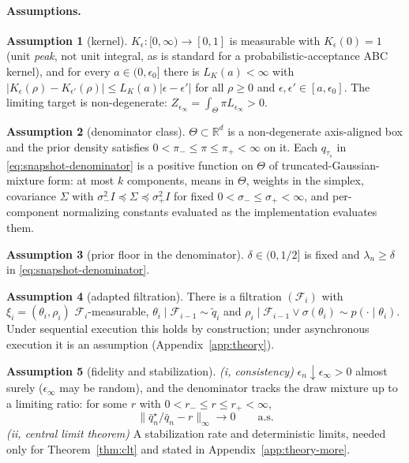 \documentclass[10pt]{article}
\theoremstyle{plain}
\theoremstyle{definition}
\newtheorem{assumption}{Assumption}
\begin{document}
\paragraph{Assumptions.}
\begin{assumption}[kernel]\label{ass:kernel} $K_\epsilon:[0,\infty)\to[0,1]$ is measurable with $K_\epsilon(0)=1$ (unit \emph{peak}, not unit integral, as is standard for a probabilistic-acceptance ABC kernel), and for every $a\in(0,\epsilon_0]$ there is $L_K(a)<\infty$ with $|K_\epsilon(\rho)-K_{\epsilon'}(\rho)|\le L_K(a)|\epsilon-\epsilon'|$ for all $\rho\ge0$ and $\epsilon,\epsilon'\in[a,\epsilon_0]$. The limiting target is non-degenerate: $Z_{\epsilon_\infty}=\int_\Theta\pi L_{\epsilon_\infty}>0$.\end{assumption}
\begin{assumption}[denominator class]\label{ass:class} $\Theta\subset\mathbb{R}^d$ is a non-degenerate axis-aligned box and the prior density satisfies $0<\pi_-\le\pi\le\pi_+<\infty$ on it. Each $q_{\tau_s}$ in \eqref{eq:snapshot-denominator} is a positive function on $\Theta$ of truncated-Gaussian-mixture form: at most $k$ components, means in $\Theta$, weights in the simplex, covariance $\Sigma$ with $\sigma_-^2I\preceq\Sigma\preceq\sigma_+^2I$ for fixed $0<\sigma_-\le\sigma_+<\infty$, and per-component normalizing constants evaluated as the implementation evaluates them.\end{assumption}
\begin{assumption}[prior floor in the denominator]\label{ass:defensive} $\delta\in(0,1/2]$ is fixed and $\lambda_n\ge\delta$ in \eqref{eq:snapshot-denominator}.\end{assumption}
\begin{assumption}[adapted filtration]\label{ass:filtration} There is a filtration $(\mathcal{F}_i)$ with $\xi_i=(\theta_i,\rho_i)$ $\mathcal{F}_i$-measurable, $\theta_i\mid\mathcal{F}_{i-1}\sim\tilde q_i$ and $\rho_i\mid\mathcal{F}_{i-1}\vee\sigma(\theta_i)\sim p(\cdot\mid\theta_i)$. Under sequential execution this holds by construction; under asynchronous execution it is an assumption (Appendix~\ref{app:theory}).\end{assumption}
\begin{assumption}[fidelity and stabilization]\label{ass:stab} \emph{(i, consistency)} $\epsilon_n\downarrow\epsilon_\infty>0$ almost surely ($\epsilon_\infty$ may be random), and the denominator tracks the draw mixture up to a limiting ratio: for some $r$ with $0<r_-\le r\le r_+<\infty$,
\begin{equation}
\bigl\|\bar q^\star_n/\bar q_n-r\bigr\|_\infty\longrightarrow0\qquad\text{a.s.}
\label{eq:fidelity}
\end{equation}
\emph{(ii, central limit theorem)} A stabilization rate and deterministic limits, needed only for Theorem~\ref{thm:clt} and stated in Appendix~\ref{app:theory-more}.
\end{assumption}
\end{document}
